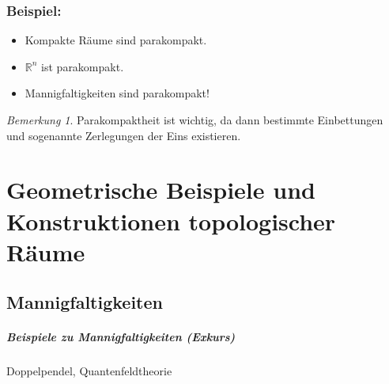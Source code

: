 \documentclass[a4paper,11pt,notitlepage]{report}
\theoremstyle{remark}
\newtheorem{remark}{Bemerkung}[chapter]
\theoremstyle{definition}
\newcommand{\R}{{\ensuremath{\mathbb{R}}}}
\newenvironment{bsp}[1]
{
\setlength{\fboxsep}{10pt}
\subsection*{Beispiel: #1}
\begin{upshape}
}
{
\end{upshape}
}
\begin{document}
\begin{bsp}{}
	 \begin{itemize}
	 	\item Kompakte Räume sind parakompakt.
	 	\item $\R^n$ ist parakompakt.
	 	\item Mannigfaltigkeiten sind parakompakt!
	 \end{itemize}
\end{bsp}

\begin{remark}{}
	Parakompaktheit ist wichtig, da dann bestimmte Einbettungen und sogenannte Zerlegungen der Eins existieren.
\end{remark}

\chapter{Geometrische Beispiele und Konstruktionen topologischer Räume}
\section{Mannigfaltigkeiten}

\paragraph{Beispiele zu Mannigfaltigkeiten (Exkurs)} Doppelpendel, Quantenfeldtheorie
\end{document}
